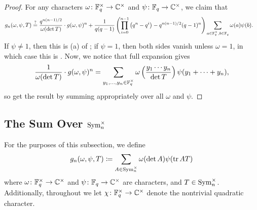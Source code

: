 \begin{proof}
    For any characters $\omega\colon\mathbb F_q^\times\to\mathbb C^\times$ and $\psi\colon\mathbb F_q\to\mathbb C^\times$, we claim that
    \begin{align*}
        g_n(\omega,\psi,T) &\stackrel?= \frac{q^{n(n-1)/2}}{\omega(\det T)}\cdot g(\omega,\psi)^n+\frac1{q(q-1)}\left(\prod_{i=0}^{n-1}\left(q^n-q^i\right)-q^{n(n-1)/2}(q-1)^n\right)\sum_{a\in\mathbb F_q^\times,b\in\mathbb F_q}\omega(a)\psi(b).
    \end{align*}
    If $\psi\ne1$, then this is (a) of ; if $\psi=1$, then both sides vanish unless $\omega=1$, in which case this is . Now, we notice that full expansion gives
    \[\frac1{\omega(\det T)}\cdot g(\omega,\psi)^n=\sum_{y_1,\ldots,y_n\in\mathbb F_q^\times}\omega\left(\frac{y_1\cdots y_n}{\det T}\right)\psi(y_1+\cdots+y_n),\]
    so get the result by summing appropriately over all $\omega$ and $\psi$.
\end{proof}

\subsection{The Sum Over \texorpdfstring{$\operatorname{Sym}_n^\times$}{ Sym}}
For the purposes of this subsection, we define
\[g_n(\omega,\psi,T)\coloneqq\sum_{A\in\operatorname{Sym}_n^\times}\omega(\det A)\psi(\operatorname{tr} AT)\]
where $\omega\colon\mathbb F_q^\times\to\mathbb C^\times$ and $\psi\colon\mathbb F_q\to\mathbb C^\times$ are characters, and $T\in\operatorname{Sym}_n^\times$. Additionally, throughout we let $\chi\colon\mathbb F_q^\times\to\mathbb C^\times$ denote the nontrivial quadratic character.

